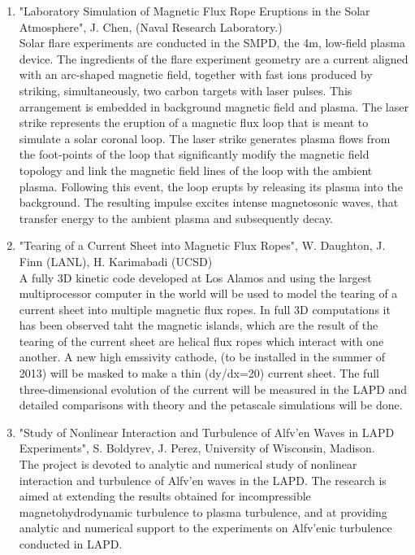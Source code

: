 \documentclass[11pt]{article}
\begin{document}
\begin{enumerate}
\item "Laboratory Simulation of Magnetic Flux Rope Eruptions in the Solar Atmosphere", J. Chen, (Naval Research Laboratory.)\\
Solar flare experiments are conducted in the SMPD, the 4m, low-field plasma device. The ingredients of the flare experiment geometry are a current aligned with an arc-shaped magnetic field, together with fast ions produced by striking, simultaneously, two carbon targets with laser pulses. This arrangement is embedded in background magnetic field and plasma. The laser strike represents the eruption of a magnetic flux loop that is meant to simulate a solar coronal loop. The laser strike generates plasma flows from the foot-points of the loop that significantly modify the magnetic field topology and link the magnetic field lines of the loop with the ambient plasma. Following this event, the loop erupts by releasing its plasma into the background. The resulting impulse excites intense magnetosonic waves, that transfer energy to the ambient plasma and subsequently decay.

\item "Tearing of a Current Sheet into Magnetic Flux Ropes", W. Daughton, J. Finn (LANL), H. Karimabadi (UCSD)\\
A fully 3D kinetic code developed at Los Alamos and using the largest multiprocessor computer in the world will be used to model the tearing of a current sheet into multiple magnetic flux ropes. In full 3D computations it has been observed taht the magnetic islands, which are the result of the tearing of the current sheet are helical flux ropes which interact with one another. A new high emssivity cathode, (to be installed in the summer of 2013) will be masked to make a thin (dy/dx=20) current sheet. The full three-dimensional evolution of the current will be measured in the LAPD and detailed comparisons with theory and the petascale simulations will be done. 


\item "Study of Nonlinear Interaction and Turbulence of Alfv'{e}n Waves in LAPD Experiments", S. Boldyrev, J. Perez, University of Wisconsin, Madison.\\
The project is devoted to analytic and numerical study of nonlinear interaction and turbulence of Alfv'{e}n waves in the LAPD. The research is aimed at extending the results obtained for incompressible magnetohydrodynamic turbulence to plasma turbulence, and at providing analytic and numerical support to the experiments on Alfv'{e}nic turbulence conducted in LAPD. 
\end{enumerate}
\end{document}
